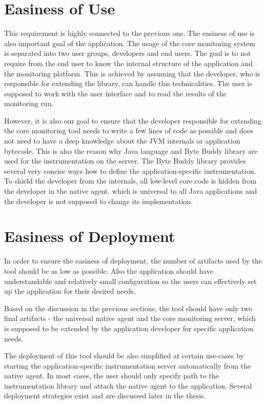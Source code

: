 \section{Easiness of Use}
This requirement is highly connected to the previous one. The easiness of use is also important goal of the application. The usage of the core monitoring system is separated into two user groups, developers and end users. The goal is to not require from the end user to know the internal structure of the application and the monitoring platform. This is achieved by assuming that the developer, who is responsible for extending the library, can handle this technicalities. The user is supposed to work with the user interface and to read the results of the monitoring run. 

However, it is also our goal to ensure that the developer responsible for extending the core monitoring tool needs to write a few lines of code as possible and does not need to have a deep knowledge about the JVM internals or application bytecode. This is also the reason why Java language and Byte Buddy library are used for the instrumentation on the server. The Byte Buddy library provides several very concise ways how to define the application-specific instrumentation. To shield the developer from the internals, all low-level core code is hidden from the developer in the native agent, which is universal to all Java applications and the developer is not supposed to change its implementation.

\section{Easiness of Deployment}
In order to ensure the easiness of deployment, the number of artifacts used by the tool should be as low as possible. Also the application should have understandable and relatively small configuration so the users can effectively set up the application for their desired needs. 

Based on the discussion in the previous sections, the tool should have only two final artifacts - the universal native agent and the core monitoring server, which is supposed to be extended by the application developer for specific application needs.

The deployment of this tool should be also simplified at certain use-cases by starting the application-specific instrumentation server automatically from the native agent. In most cases, the user should only specify path to the instrumentation library and attach the native agent to the application. Several deployment strategies exist and are discussed later in the thesis.


